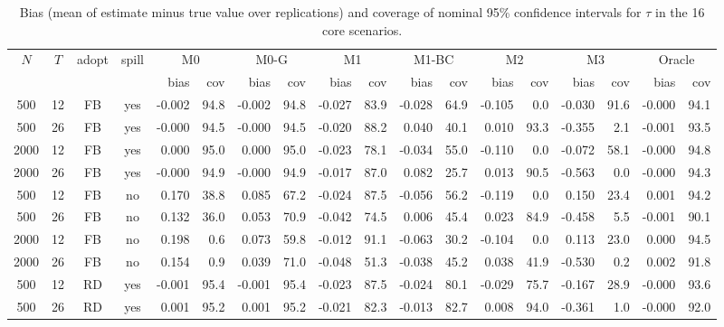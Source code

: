 \begin{table}[!t]
\centering
\caption{Bias (mean of estimate minus true value over replications) and coverage of nominal 95\% confidence intervals for $\tau$ in the 16 core scenarios.}
\label{tab:sim-core-tau}
\footnotesize
\setlength{\tabcolsep}{3.5pt}
\begin{adjustbox}{max width=\linewidth}
\begin{tabular}{ccccrrrrrrrrrrrrrr}
\toprule
$N$ & $T$ & adopt & spill & \multicolumn{2}{c}{M0} & \multicolumn{2}{c}{M0-G} & \multicolumn{2}{c}{M1} & \multicolumn{2}{c}{M1-BC} & \multicolumn{2}{c}{M2} & \multicolumn{2}{c}{M3} & \multicolumn{2}{c}{Oracle} \\
\cmidrule(lr){5-6}\cmidrule(lr){7-8}\cmidrule(lr){9-10}\cmidrule(lr){11-12}\cmidrule(lr){13-14}\cmidrule(lr){15-16}\cmidrule(lr){17-18}
 & & & & bias & cov & bias & cov & bias & cov & bias & cov & bias & cov & bias & cov & bias & cov \\
\midrule
500 & 12 & FB & yes & -0.002 & 94.8 & -0.002 & 94.8 & -0.027 & 83.9 & -0.028 & 64.9 & -0.105 & 0.0 & -0.030 & 91.6 & -0.000 & 94.1 \\
500 & 26 & FB & yes & -0.000 & 94.5 & -0.000 & 94.5 & -0.020 & 88.2 & 0.040 & 40.1 & 0.010 & 93.3 & -0.355 & 2.1 & -0.001 & 93.5 \\
2000 & 12 & FB & yes & 0.000 & 95.0 & 0.000 & 95.0 & -0.023 & 78.1 & -0.034 & 55.0 & -0.110 & 0.0 & -0.072 & 58.1 & -0.000 & 94.8 \\
2000 & 26 & FB & yes & -0.000 & 94.9 & -0.000 & 94.9 & -0.017 & 87.0 & 0.082 & 25.7 & 0.013 & 90.5 & -0.563 & 0.0 & -0.000 & 94.3 \\
500 & 12 & FB & no & 0.170 & 38.8 & 0.085 & 67.2 & -0.024 & 87.5 & -0.056 & 56.2 & -0.119 & 0.0 & 0.150 & 23.4 & 0.001 & 94.2 \\
500 & 26 & FB & no & 0.132 & 36.0 & 0.053 & 70.9 & -0.042 & 74.5 & 0.006 & 45.4 & 0.023 & 84.9 & -0.458 & 5.5 & -0.001 & 90.1 \\
2000 & 12 & FB & no & 0.198 & 0.6 & 0.073 & 59.8 & -0.012 & 91.1 & -0.063 & 30.2 & -0.104 & 0.0 & 0.113 & 23.0 & 0.000 & 94.5 \\
2000 & 26 & FB & no & 0.154 & 0.9 & 0.039 & 71.0 & -0.048 & 51.3 & -0.038 & 45.2 & 0.038 & 41.9 & -0.530 & 0.2 & 0.002 & 91.8 \\
500 & 12 & RD & yes & -0.001 & 95.4 & -0.001 & 95.4 & -0.023 & 87.5 & -0.024 & 80.1 & -0.029 & 75.7 & -0.167 & 28.9 & -0.000 & 93.6 \\
500 & 26 & RD & yes & 0.001 & 95.2 & 0.001 & 95.2 & -0.021 & 82.3 & -0.013 & 82.7 & 0.008 & 94.0 & -0.361 & 1.0 & -0.000 & 92.0 \\

\end{tabular}
\end{adjustbox}
\end{table}
